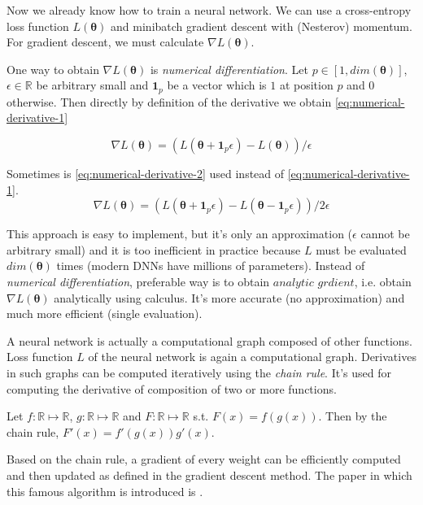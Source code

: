 Now we already know how to train a neural network. We can use a cross-entropy loss function $L (\pmb \theta)$ and minibatch gradient descent with (Nesterov) momentum. For gradient descent, we must calculate $\nabla L (\pmb \theta)$.

One way to obtain $\nabla L (\pmb \theta)$ is \textit{numerical differentiation}. 
Let $p \in [1, dim(\pmb \theta)]$, $\epsilon \in \mathbb{R}$ be arbitrary small and $\pmb 1_p$ be a vector which is $1$ at position $p$ and $0$ otherwise. Then directly by definition of the derivative we obtain \ref{eq:numerical-derivative-1}

\begin{equation}\label{eq:numerical-derivative-1}
\nabla L (\pmb \theta) = (L(\pmb \theta + \pmb 1_p \epsilon) - L (\pmb \theta)) / \epsilon
\end{equation}

Sometimes is \ref{eq:numerical-derivative-2} used instead of \ref{eq:numerical-derivative-1}.
\begin{equation}\label{eq:numerical-derivative-2}
\nabla L (\pmb \theta) = (L(\pmb \theta + \pmb 1_p \epsilon) - L (\pmb \theta - \pmb 1_p \epsilon)) / 2 \epsilon
\end{equation}

This approach is easy to implement, but it's only an approximation ($\epsilon$ cannot be arbitrary small) and it is too inefficient in practice because $L$ must be evaluated $dim(\pmb\theta)$ times (modern DNNs have millions of parameters). Instead of \textit{numerical differentiation}, preferable way is to obtain $\textit{analytic grdient}$, i.e. obtain $\nabla L (\pmb \theta)$ analytically using calculus. It's more accurate (no approximation) and much more efficient (single evaluation).


A neural network is actually a computational graph composed of other functions. Loss function $L$ of the neural network is again a computational graph. Derivatives in such graphs can be computed iteratively using the \textit{chain rule}. It's used for computing the derivative of composition of two or more functions. 

Let $f: \mathbb{R} \mapsto \mathbb{R}$, $g: \mathbb{R} \mapsto \mathbb{R}$ and $F: \mathbb{R} \mapsto \mathbb{R}$ s.t. $F(x) = f(g(x))$. Then by the chain rule, $F'(x) = f'(g(x))g'(x)$.

Based on the chain rule, a gradient of every weight can be efficiently computed and then updated as defined in the gradient descent method. The paper in which this famous algorithm is introduced is \cite{Rumelhart:1986:LIR:104279.104293}.